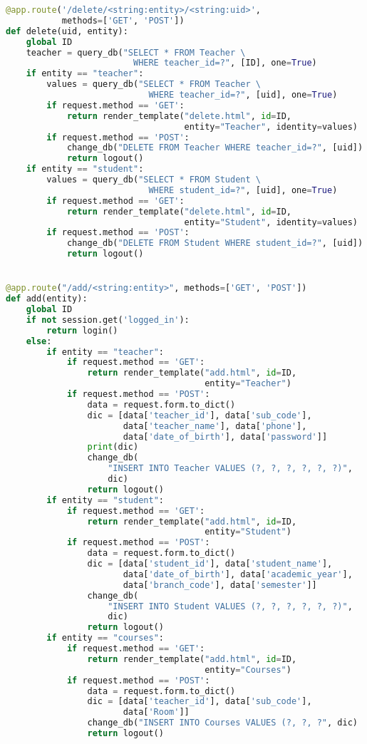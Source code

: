 \begin{lstlisting}[language=python]
@app.route('/delete/<string:entity>/<string:uid>',
           methods=['GET', 'POST'])
def delete(uid, entity):
    global ID
    teacher = query_db("SELECT * FROM Teacher \
                         WHERE teacher_id=?", [ID], one=True)
    if entity == "teacher":
        values = query_db("SELECT * FROM Teacher \
                            WHERE teacher_id=?", [uid], one=True)
        if request.method == 'GET':
            return render_template("delete.html", id=ID,
                                   entity="Teacher", identity=values)
        if request.method == 'POST':
            change_db("DELETE FROM Teacher WHERE teacher_id=?", [uid])
            return logout()
    if entity == "student":
        values = query_db("SELECT * FROM Student \
                            WHERE student_id=?", [uid], one=True)
        if request.method == 'GET':
            return render_template("delete.html", id=ID,
                                   entity="Student", identity=values)
        if request.method == 'POST':
            change_db("DELETE FROM Student WHERE student_id=?", [uid])
            return logout()


@app.route("/add/<string:entity>", methods=['GET', 'POST'])
def add(entity):
    global ID
    if not session.get('logged_in'):
        return login()
    else:
        if entity == "teacher":
            if request.method == 'GET':
                return render_template("add.html", id=ID,
                                       entity="Teacher")
            if request.method == 'POST':
                data = request.form.to_dict()
                dic = [data['teacher_id'], data['sub_code'],
                       data['teacher_name'], data['phone'],
                       data['date_of_birth'], data['password']]
                print(dic)
                change_db(
                    "INSERT INTO Teacher VALUES (?, ?, ?, ?, ?, ?)",
                    dic)
                return logout()
        if entity == "student":
            if request.method == 'GET':
                return render_template("add.html", id=ID,
                                       entity="Student")
            if request.method == 'POST':
                data = request.form.to_dict()
                dic = [data['student_id'], data['student_name'],
                       data['date_of_birth'], data['academic_year'],
                       data['branch_code'], data['semester']]
                change_db(
                    "INSERT INTO Student VALUES (?, ?, ?, ?, ?, ?)",
                    dic)
                return logout()
        if entity == "courses":
            if request.method == 'GET':
                return render_template("add.html", id=ID,
                                       entity="Courses")
            if request.method == 'POST':
                data = request.form.to_dict()
                dic = [data['teacher_id'], data['sub_code'],
                       data['Room']]
                change_db("INSERT INTO Courses VALUES (?, ?, ?", dic)
                return logout()



\end{lstlisting}
